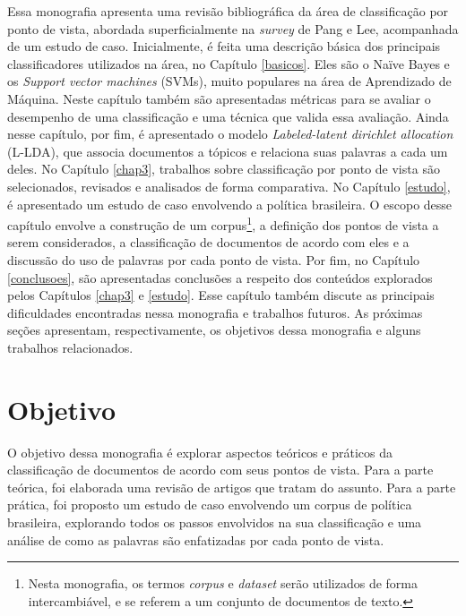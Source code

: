 Essa monografia apresenta uma revisão bibliográfica da área de classificação por ponto de vista, abordada superficialmente na \emph{survey} de Pang e Lee, acompanhada de um estudo de caso. Inicialmente, é feita uma descrição básica dos principais classificadores utilizados na área, no Capítulo \ref{basicos}. Eles são o Naïve Bayes e os \emph{Support vector machines} (SVMs), muito populares na área de Aprendizado de Máquina. Neste capítulo também são apresentadas métricas para se avaliar o desempenho de uma classificação e uma técnica que valida essa avaliação. Ainda nesse capítulo, por fim, é apresentado o modelo \emph{Labeled-latent dirichlet allocation} (L-LDA), que associa documentos a tópicos e relaciona suas palavras a cada um deles. No Capítulo \ref{chap3}, trabalhos sobre classificação por ponto de vista são selecionados, revisados e analisados de forma comparativa. No Capítulo \ref{estudo}, é apresentado um estudo de caso envolvendo a política brasileira. O escopo desse capítulo envolve a construção de um corpus\footnote{Nesta monografia, os termos \emph{corpus} e \emph{dataset} serão utilizados de forma intercambiável, e se referem a um conjunto de documentos de texto.}, a definição dos pontos de vista a serem considerados, a classificação de documentos de acordo com eles e a discussão do uso de palavras por cada ponto de vista. Por fim, no Capítulo \ref{conclusoes}, são apresentadas conclusões a respeito dos conteúdos explorados pelos Capítulos \ref{chap3} e \ref{estudo}. Esse capítulo também discute as principais dificuldades encontradas nessa monografia e trabalhos futuros. As próximas seções apresentam, respectivamente, os objetivos dessa monografia e alguns trabalhos relacionados.



\section{Objetivo}
\label{objetivo}

O objetivo dessa monografia é explorar aspectos teóricos e práticos da classificação de documentos de acordo com seus pontos de vista. Para a parte teórica, foi elaborada uma revisão de artigos que tratam do assunto. Para a parte prática, foi proposto um estudo de caso envolvendo um corpus de política brasileira, explorando todos os passos envolvidos na sua classificação e uma análise de como as palavras são enfatizadas por cada ponto de vista. 

